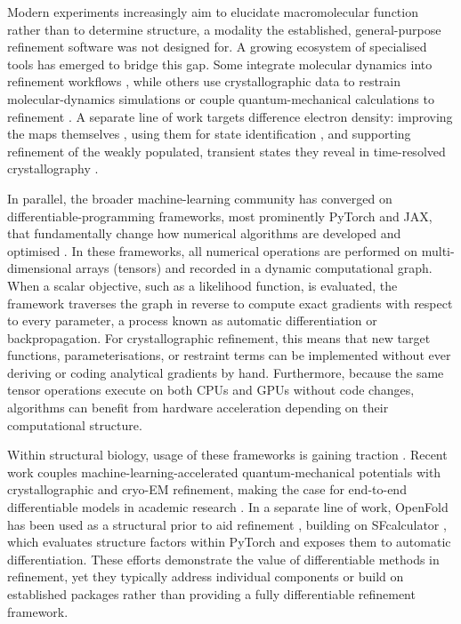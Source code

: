\documentclass{iucrjournals}
\begin{document}
Modern experiments increasingly aim to elucidate macromolecular function
rather than to determine structure, a modality the established,
general-purpose refinement software was not designed for. A growing
ecosystem of specialised tools has emerged to bridge this gap. Some integrate molecular
dynamics into refinement workflows \cite{moriarty_improved_2020}, while
others use crystallographic data to restrain molecular-dynamics simulations
\cite{mikhailovskii_x-ray_2024} or couple quantum-mechanical calculations
to refinement \cite{lundgren_quantum_2024}. A separate line of work targets
difference electron density: improving the maps themselves
\cite{fadini_denoising_2025}, using them for state identification
\cite{wickstrand_tool_2020}, and supporting refinement of the
weakly populated, transient states they reveal in time-resolved
crystallography \cite{de_zitter_xtrapol8_2022}.

In parallel, the broader machine-learning community has converged on
differentiable-programming frameworks, most prominently PyTorch and JAX, that
fundamentally change how numerical algorithms are developed and optimised
\cite{paszke2019pytorchimperativestylehighperformance,jax2018github}.
In these frameworks, all numerical operations are performed on
multi-dimensional arrays (tensors) and recorded in a dynamic computational
graph.
When a scalar objective, such as a likelihood function, is evaluated, the
framework traverses the graph in reverse to compute exact gradients with
respect to every parameter, a process known as automatic differentiation or
backpropagation.
For crystallographic refinement, this means that new target functions,
parameterisations, or restraint terms can be implemented without ever deriving
or coding analytical gradients by hand.
Furthermore, because the same tensor operations execute on both CPUs and GPUs
without code changes, algorithms can benefit from hardware acceleration
depending on their computational structure.

Within structural biology, usage of these frameworks is gaining traction \cite{alquraishi_differentiable_2021,gasparotto_toro_2024}. 
Recent work couples machine-learning-accelerated quantum-mechanical potentials with crystallographic and cryo-EM refinement, 
making the case for end-to-end differentiable models in academic research \cite{zubatyuk_aquaref_2025}. 
In a separate line of work, OpenFold has been used as a structural prior to aid refinement \cite{fadini_alphafold_2026},
building on SFcalculator \cite{Li2025.01.12.632630},
which evaluates structure factors within PyTorch and exposes them to automatic differentiation.
These efforts demonstrate the value of differentiable methods in refinement, yet they typically
address individual components or build on established packages rather than providing a fully
differentiable refinement framework.
\end{document}
